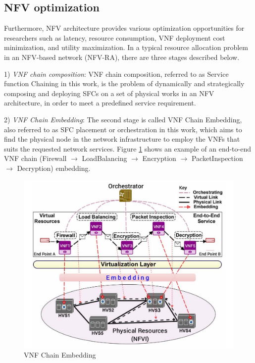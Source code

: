 \subsection{NFV optimization}
Furthermore, NFV architecture provides various optimization opportunities for researchers such as latency, resource consumption, VNF deployment cost minimization, and utility maximization. In a typical resource allocation problem in an NFV-based network (NFV-RA), there are three stages described below.

1) \textit{VNF chain composition}: VNF chain composition, referred to as Service function Chaining in this work, is the problem of dynamically and strategically composing and deploying SFCs on a set of physical works in an NFV architecture, in order to meet a predefined service requirement. 


2) \textit{VNF Chain Embedding}: The second stage is called VNF Chain Embedding, also referred to as SFC placement or orchestration in this work, which aims to find the physical node in the network infrastructure to employ the VNFs that suits the requested network services. Figure \ref{fig:SFC embedding} shows an example of an end-to-end VNF chain (Firewall $\rightarrow$ LoadBalancing $\rightarrow$ Encryption $\rightarrow$ PacketInspection $\rightarrow$ Decryption) embedding.


\begin{figure}
	\centering
	\includegraphics[width=0.9\linewidth]{figs/SFCembedding.PNG}
		\vspace{\baselineskip}
	\caption{VNF Chain Embedding \cite{herrera2016resource}}
	\label{fig:SFC embedding}
\end{figure}

